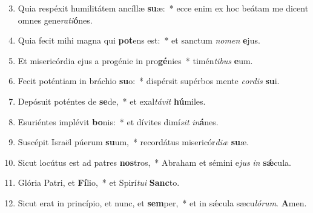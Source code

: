 \begin{enumerate}
\setcounter{enumi}{2}

\item Quia respéxit humilitátem ancíllæ \textbf{su}æ:~* ecce enim ex hoc beátam me dicent omnes gene\textit{ra}\textit{ti}\textbf{ó}nes.

\item Quia fecit mihi magna qui \textbf{pot}ens est:~* et sanctum \textit{no}\textit{men} \textbf{e}jus.

\item Et misericórdia ejus a progénie in pro\textbf{gé}nies~* timén\textit{ti}\textit{bus} \textbf{e}um.

\item Fecit poténtiam in bráchio \textbf{su}o:~* dispérsit supérbos mente \textit{cor}\textit{dis} \textbf{su}i.

\item Depósuit poténtes de \textbf{se}de,~* et exal\textit{tá}\textit{vit} \textbf{hú}miles.

\item Esuriéntes implévit \textbf{bo}nis:~* et dívites dimí\textit{sit} \textit{in}\textbf{á}nes.

\item Suscépit Israël púerum \textbf{su}um,~* recordátus misericór\textit{di}\textit{æ} \textbf{su}æ.

\item Sicut locútus est ad patres \textbf{nos}tros,~* Abraham et sémini e\textit{jus} \textit{in} \textbf{sǽ}cula.

\item Glória Patri, et \textbf{Fí}lio,~* et Spirí\textit{tu}\textit{i} \textbf{Sanc}to.

\item Sicut erat in princípio, et nunc, et \textbf{sem}per,~* et in sǽcula sæcu\textit{ló}\textit{rum}. \textbf{A}men.

\end{enumerate}

